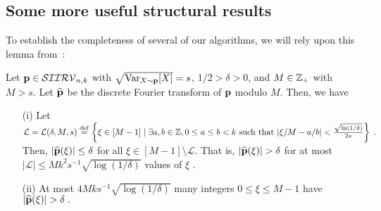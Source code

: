 \subsection{Some more useful structural results}\label{sec:learn}
To establish the completeness of several of our algorithms, we will rely upon this lemma from~\cite{DKS:15}:
\begin{lemma}\label{lemma:FourierSupportLem}
Let $\p \in \classksiirv[n]{k}$ with $\sqrt{\var_{X \sim \p}[X]} = s$, $1/2>\delta>0$, and $M \in \Z_+$ with $M>s$.
Let $\fourier{\p}$ be the discrete Fourier transform of $\p$ modulo $M$. Then, we have
  \begin{enumerate}
    \item[(i)]\label{lemma:FourierSupportLem:i} Let $\mathcal{L} = \mathcal{L}(\delta, M,s) \eqdef \left\{ \xi \in [M-1] \mid \exists a, b \in \Z, 0 \leq a \leq b < k \textrm{ such that }
    |\xi/M - a/b| <  \frac{\sqrt{\ln (1/\delta)}}{2s}  \right\} \;.$ Then, $|\fourier{\p}(\xi)| \leq \delta$ for all $\xi \in [M-1] \setminus \mathcal{L}.$
    That is, $|\fourier{\p}(\xi)| > \delta$ for
    at most $|\mathcal{L}| \leq M k^2 s^{-1} \sqrt{\log(1/\delta)}$ values of $\xi$ .
    \item[(ii)]\label{lemma:FourierSupportLem:ii} At most $4Mks^{-1}\sqrt{\log(1/\delta)}$ many integers $0 \leq \xi \leq M-1$ have  $|\fourier{\p}(\xi)| > \delta \;.$
  \end{enumerate}
\end{lemma}


